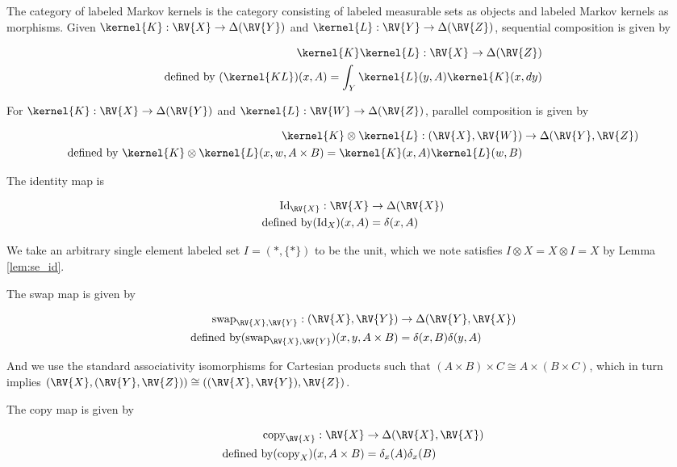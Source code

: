 The category of labeled Markov kernels is the category consisting of labeled measurable sets as objects and labeled Markov kernels as morphisms. Given $\kernel{K}:\RV{X}\to \Delta(\RV{Y})$ and $\kernel{L}:\RV{Y}\to \Delta(\RV{Z})$, sequential composition is given by

\begin{align}
    \kernel{K}\kernel{L}:\RV{X}\to \Delta(\RV{Z})\\
    \text{defined by } (\kernel{KL})(x,A) = \int_Y \kernel{L}(y,A)\kernel{K}(x,dy)
\end{align}

For $\kernel{K}:\RV{X}\to \Delta(\RV{Y})$ and $\kernel{L}:\RV{W}\to\Delta(\RV{Z})$, parallel composition is given by

\begin{align}
    \kernel{K}\otimes\kernel{L}: (\RV{X},\RV{W}) &\to \Delta(\RV{Y},\RV{Z})\\
    \text{defined by } \kernel{K}\otimes\kernel{L}(x,w,A\times B) = \kernel{K}(x,A)\kernel{L}(w,B)
\end{align}

The identity map is

\begin{align}
    \text{Id}_{\RV{X}}: \RV{X}&\to\Delta(\RV{X})\\
    \text{defined by} (\text{Id}_X) (x,A) &= \delta(x,A)
\end{align}

We take an arbitrary single element labeled set $I=(*,\{*\})$ to be the unit, which we note satisfies $I\otimes X=X\otimes I=X$ by Lemma \ref{lem:se_id}.

The swap map is given by

\begin{align}
    \text{swap}_{\RV{X},\RV{Y}}: (\RV{X},\RV{Y})&\to \Delta(\RV{Y},\RV{X})\\
    \text{defined by} (\text{swap}_{\RV{X},\RV{Y}})(x,y,A\times B) &= \delta(x,B)\delta(y,A)
\end{align}

And we use the standard associativity isomorphisms for Cartesian products such that $(A\times B)\times C\cong A\times (B\times C)$, which in turn implies $(\RV{X},(\RV{Y},\RV{Z}))\cong ((\RV{X},\RV{Y}),\RV{Z})$.

The copy map is given by

\begin{align}
    \text{copy}_{\RV{X}}: \RV{X}&\to \Delta(\RV{X},\RV{X})\\
    \text{defined by} (\text{copy}_X)(x,A\times B) &= \delta_x(A)\delta_x(B)
\end{align}

